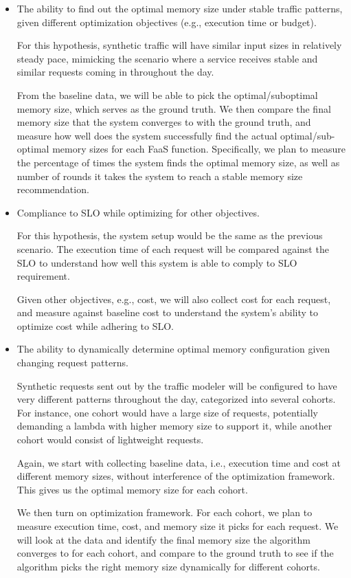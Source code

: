 \documentclass[conference]{IEEEtran}
\begin{document}
\begin{itemize}
\item The ability to find out the optimal memory size under stable traffic patterns, given different optimization objectives (e.g., execution time or budget).

For this hypothesis, synthetic traffic will have similar input sizes in relatively steady pace, mimicking the scenario where a service receives stable and similar requests coming in throughout the day. 

From the baseline data, we will be able to pick the optimal/suboptimal memory size, which serves as the ground truth. We then compare the final memory size that the system converges to with the ground truth, and measure how well does the system successfully find the actual optimal/sub-optimal memory sizes for each FaaS function. Specifically, we plan to measure the percentage of times the system finds the optimal memory size, as well as number of rounds it takes the system to reach a stable memory size recommendation.

\item Compliance to SLO while optimizing for other objectives.

For this hypothesis, the system setup would be the same as the previous scenario. The execution time of each request will be compared against the SLO to understand how well this system is able to comply to SLO requirement.

Given other objectives, e.g., cost, we will also collect cost for each request, and measure against baseline cost to understand the system's ability to optimize cost while adhering to SLO.


\item The ability to dynamically determine optimal memory configuration given changing request patterns.

Synthetic requests sent out by the traffic modeler will be configured to have very different patterns throughout the day, categorized into several cohorts. For instance, one cohort would have a large size of requests, potentially demanding a lambda with higher memory size to support it, while another cohort would consist of lightweight requests. 

Again, we start with collecting baseline data, i.e., execution time and cost at different memory sizes, without interference of the optimization framework. This gives us the optimal memory size for each cohort.

We then turn on optimization framework. For each cohort, we plan to measure execution time, cost, and memory size it picks for each request. We will look at the data and identify the final memory size the algorithm converges to for each cohort, and compare to the ground truth to see if the algorithm picks the right memory size dynamically for different cohorts.


\end{itemize}
\end{document}
